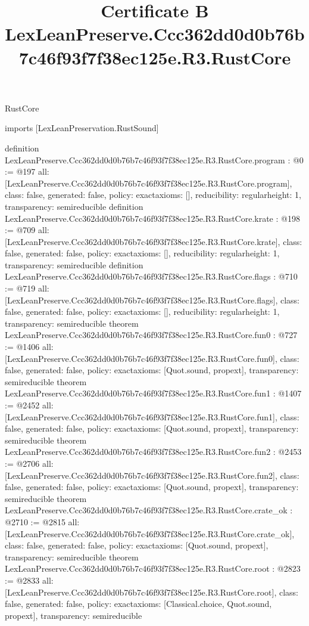 \begin{lexlean}{RustCore}
\title{Certificate B LexLeanPreserve.Ccc362dd0d0b76b7c46f93f7f38ec125e.R3.RustCore}
\begin{coremodule}
imports [LexLeanPreservation.RustSound]

definition LexLeanPreserve.Ccc362dd0d0b76b7c46f93f7f38ec125e.R3.RustCore.program : @0 := @197 {
  all: [LexLeanPreserve.Ccc362dd0d0b76b7c46f93f7f38ec125e.R3.RustCore.program],
  class: false,
  generated: false,
  policy: exact{axioms: []},
  reducibility: regular{height: 1},
  transparency: semireducible
}
definition LexLeanPreserve.Ccc362dd0d0b76b7c46f93f7f38ec125e.R3.RustCore.krate : @198 := @709 {
  all: [LexLeanPreserve.Ccc362dd0d0b76b7c46f93f7f38ec125e.R3.RustCore.krate],
  class: false,
  generated: false,
  policy: exact{axioms: []},
  reducibility: regular{height: 1},
  transparency: semireducible
}
definition LexLeanPreserve.Ccc362dd0d0b76b7c46f93f7f38ec125e.R3.RustCore.flags : @710 := @719 {
  all: [LexLeanPreserve.Ccc362dd0d0b76b7c46f93f7f38ec125e.R3.RustCore.flags],
  class: false,
  generated: false,
  policy: exact{axioms: []},
  reducibility: regular{height: 1},
  transparency: semireducible
}
theorem LexLeanPreserve.Ccc362dd0d0b76b7c46f93f7f38ec125e.R3.RustCore.fun0 : @727 := @1406 {
  all: [LexLeanPreserve.Ccc362dd0d0b76b7c46f93f7f38ec125e.R3.RustCore.fun0],
  class: false,
  generated: false,
  policy: exact{axioms: [Quot.sound, propext]},
  transparency: semireducible
}
theorem LexLeanPreserve.Ccc362dd0d0b76b7c46f93f7f38ec125e.R3.RustCore.fun1 : @1407 := @2452 {
  all: [LexLeanPreserve.Ccc362dd0d0b76b7c46f93f7f38ec125e.R3.RustCore.fun1],
  class: false,
  generated: false,
  policy: exact{axioms: [Quot.sound, propext]},
  transparency: semireducible
}
theorem LexLeanPreserve.Ccc362dd0d0b76b7c46f93f7f38ec125e.R3.RustCore.fun2 : @2453 := @2706 {
  all: [LexLeanPreserve.Ccc362dd0d0b76b7c46f93f7f38ec125e.R3.RustCore.fun2],
  class: false,
  generated: false,
  policy: exact{axioms: [Quot.sound, propext]},
  transparency: semireducible
}
theorem LexLeanPreserve.Ccc362dd0d0b76b7c46f93f7f38ec125e.R3.RustCore.crate_ok : @2710 := @2815 {
  all: [LexLeanPreserve.Ccc362dd0d0b76b7c46f93f7f38ec125e.R3.RustCore.crate_ok],
  class: false,
  generated: false,
  policy: exact{axioms: [Quot.sound, propext]},
  transparency: semireducible
}
theorem LexLeanPreserve.Ccc362dd0d0b76b7c46f93f7f38ec125e.R3.RustCore.root : @2823 := @2833 {
  all: [LexLeanPreserve.Ccc362dd0d0b76b7c46f93f7f38ec125e.R3.RustCore.root],
  class: false,
  generated: false,
  policy: exact{axioms: [Classical.choice, Quot.sound, propext]},
  transparency: semireducible
}


\end{coremodule}
\end{lexlean}
